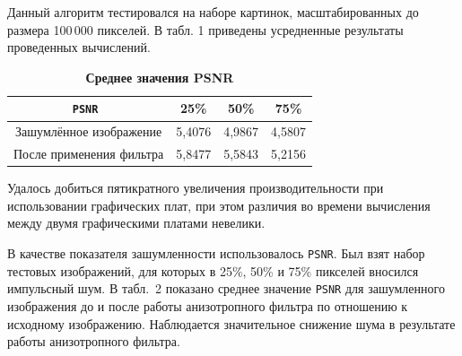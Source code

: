 Данный алгоритм тестировался на наборе картинок, масштабированных до размера 100\,000 пикселей. 
В табл. 1 приведены усредненные результаты проведенных вычислений.

\begin{table}[b!]
\centering \vspace{-3mm}
\begin{minipage}[t]{.67\textwidth} \small \centering 
\caption{\bf Среднее значения PSNR }\vspace{-3mm}
\begin{tabular}{c|c|c|c}
\hline 
\footnotesize \tt PSNR & \footnotesize 25\% & \footnotesize 50\% & \footnotesize 75\% \\
\hline
\rule{0mm}{12pt}%
 Зашумлённое изображение & 5,4076 & 4,9867 & 4,5807   \\
 После применения фильтра & 5,8477 & 5,5843 & 5,2156    \\
\hline
\end{tabular} 
\label{yudashkin:tab2}
\end{minipage}  \vspace{-3mm}
\end{table}

Удалось добиться пятикратного увеличения производительности при использовании графических плат, 
при этом различия во времени вычисления между двумя графическими платами невелики. 

В качестве показателя зашумленности использовалось {\tt PSNR}. 
Был взят набор тестовых изображений, для которых в 25\%, 50\% и 75\% пикселей 
вносился импульсный шум. В табл.~2 показано среднее значение 
{\tt PSNR} для зашумленного изображения до и после работы анизотропного фильтра 
по отношению к исходному изображению. 
Наблюдается значительное снижение шума в результате работы анизотропного \mbox{фильтра. }

\newpage


